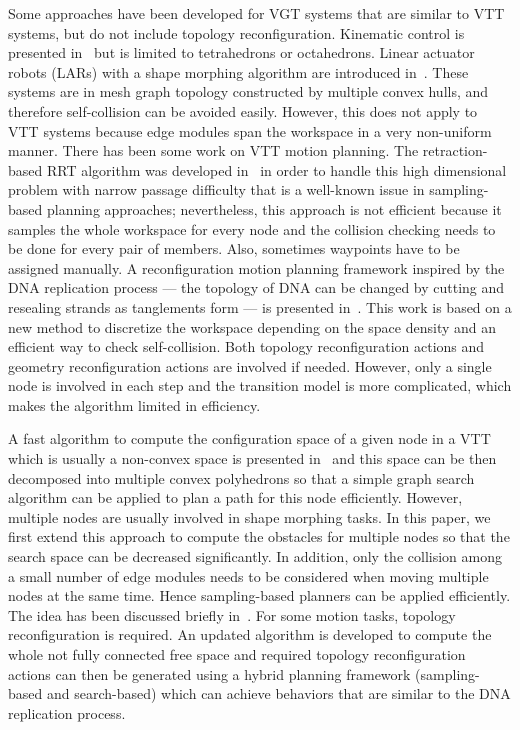 \documentclass[journal]{IEEEtran}
\begin{document}
Some approaches have been developed for VGT systems that are similar
to VTT systems, but do not include topology reconfiguration. Kinematic
control is presented in~\cite{Hamlin-tetrobot-ram-1997} but is limited
to tetrahedrons or octahedrons. Linear actuator robots (LARs) with a
shape morphing algorithm are introduced
in~\cite{Schwager-lar-iros-2017}. These systems are in mesh graph
topology constructed by multiple convex hulls, and therefore
self-collision can be avoided easily. However, this does not apply to
VTT systems because edge modules span the workspace in a very
non-uniform manner. There has been some work on VTT motion
planning. The retraction-based RRT algorithm was developed
in~\cite{vtt-review-ur-2018} in order to handle this high dimensional
problem with narrow passage difficulty that is a well-known issue in
sampling-based planning approaches; nevertheless, this approach is not
efficient because it samples the whole workspace for every node and
the collision checking needs to be done for every pair of
members. Also, sometimes waypoints have to be assigned manually. A
reconfiguration motion planning framework inspired by the DNA
replication process --- the topology of DNA can be changed by cutting
and resealing strands as tanglements form --- is presented
in~\cite{Liu-vtt-planning-iros-2019}. This work is based on a new
method to discretize the workspace depending on the space density and
an efficient way to check self-collision. Both topology
reconfiguration actions and geometry reconfiguration actions are
involved if needed. However, only a single node is involved in each
step and the transition model is more complicated, which makes the
algorithm limited in efficiency.

A fast algorithm to compute the configuration space of a given node in
a VTT which is usually a non-convex space is presented
in~\cite{Liu-vtt-cspace-icra-2020} and this space can be then
decomposed into multiple convex polyhedrons so that a simple graph
search algorithm can be applied to plan a path for this node
efficiently. However, multiple nodes are usually involved in shape
morphing tasks. In this paper, we first extend this approach to
compute the obstacles for multiple nodes so that the search space can
be decreased significantly. In addition, only the collision among a
small number of edge modules needs to be considered when moving
multiple nodes at the same time. Hence sampling-based planners can be
applied efficiently. The idea has been discussed briefly
in~\cite{Liu-vtt-planning-idea-ur-2019}. For some motion tasks,
topology reconfiguration is required. An updated algorithm is
developed to compute the whole not fully connected free space and
required topology reconfiguration actions can then be generated using
a hybrid planning framework (sampling-based and search-based) which
can achieve behaviors that are similar to the DNA replication process.
\end{document}
